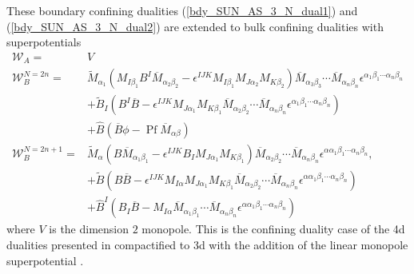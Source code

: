 \documentclass[12pt]{article}
\newcommand{\Wcal}{\mathcal{W}}
\newcommand{\Pf}{\operatorname{Pf}}
\numberwithin{equation}{section}
\begin{document}
These boundary confining dualities (\ref{bdy_SUN_AS_3_N_dual1}) and (\ref{bdy_SUN_AS_3_N_dual2}) are extended to bulk confining dualities with superpotentials
\begin{align}
    \Wcal_A = & V \\
    \Wcal_B^{N = 2n} = & \widetilde{M}_{\alpha_1} \left( M_{I \beta_1} B^I \overline{M}_{\alpha_2 \beta_2} - \epsilon^{IJK} M_{I \beta_1} M_{J \alpha_2} M_{K \beta_2} \right) \overline{M}_{\alpha_3 \beta_3} \cdots \overline{M}_{\alpha_n \beta_n} \epsilon^{\alpha_1 \beta_1 \cdots \alpha_n \beta_n}
    \nonumber \\
    & + \widetilde{B}_I \left( B^I \overline{B} - \epsilon^{IJK} M_{J \alpha_1} M_{K \beta_1} \overline{M}_{\alpha_2 \beta_2} \cdots \overline{M}_{\alpha_n \beta_n} \epsilon^{\alpha_1 \beta_1 \cdots \alpha_n \beta_n} \right)
    \nonumber \\
    & + \widehat{B} \left( \overline{B} \phi - \Pf \overline{M}_{\alpha \beta} \right)
    \\
    \Wcal_B^{N = 2n+1} = & \widetilde{M}_{\alpha} \left( B \overline{M}_{\alpha_1 \beta_1} - \epsilon^{IJK} B_I M_{J \alpha_1} M_{K \beta_1} \right) \overline{M}_{\alpha_2 \beta_2} \cdots \overline{M}_{\alpha_n \beta_n} \epsilon^{\alpha \alpha_1 \beta_1 \cdots \alpha_n \beta_n},
    \nonumber \\
    & + \widetilde{B} \left( B \overline{B} - \epsilon^{IJK} M_{I \alpha} M_{J \alpha_1} M_{K \beta_1} \overline{M}_{\alpha_2 \beta_2} \cdots \overline{M}_{\alpha_n \beta_n} \epsilon^{\alpha \alpha_1 \beta_1 \cdots \alpha_n \beta_n} \right)
    \nonumber \\
    & + \widehat{B}^I \left( B_I \overline{B} - M_{I \alpha} \overline{M}_{\alpha_1 \beta_1} \cdots \overline{M}_{\alpha_n \beta_n} \epsilon^{\alpha \alpha_1 \beta_1 \cdots \alpha_n \beta_n} \right)
\end{align}
where $V$ is the dimension $2$ monopole. This is the confining duality case of the 4d dualities presented in \cite{Berkooz:1995km, Intriligator:1995ax, Pouliot:1995me} compactified to 3d with the addition of the linear monopole superpotential \cite{Aharony:2013dha}. 
\end{document}
